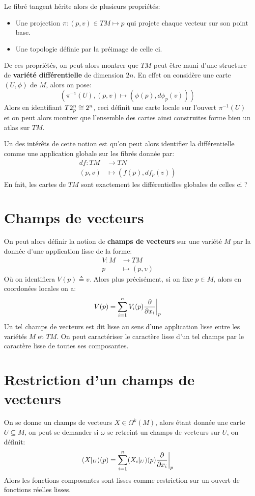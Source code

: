    Le fibré tangent hérite alors de plusieurs propriétés:
   \begin{itemize}
      \item Une projection \( \pi : (p, v) \in TM \mapsto p\) qui projete chaque vecteur sur son point base.
      \item Une topologie définie par la préimage de celle ci.
   \end{itemize}
   De ces propriétés, on peut alors montrer que \( TM \) peut être muni d'une structure de \textbf{variété différentielle} de dimension \( 2n \). En effet on considère une carte \( (U, \phi) \) de \( M \), alors on pose:
   \[ 
      \left(\pi^{-1}(U), (p, v) \mapsto (\phi(p), d\phi_p(v)) \right)
   \]
   Alors en identifiant \( T2^n_p \cong 2^n \), ceci définit une carte locale sur l'ouvert \(\pi^{-1}(U)\) et on peut alors montrer que l'ensemble des cartes ainsi construites forme bien un atlas sur \( TM \).\<

   Un des intérêts de cette notion est qu'on peut alors identifier la différentielle comme une application globale sur les fibrés donnée par:
   \[ 
      \begin{aligned}
         df : TM &\longrightarrow TN \\
         (p, v) &\longmapsto (f(p), df_p(v))
      \end{aligned} 
   \]
   En fait, les cartes de \( TM \) sont exactement les différentielles globales de celles ci ?
   \section{Champs de vecteurs}
   On peut alors définir la notion de \textbf{champs de vecteurs} sur une variété \( M \) par la donnée d'une application lisse de la forme:
   \[ 
      \begin{aligned}
         V : M &\longrightarrow TM \\
         p &\longmapsto (p, v)
      \end{aligned} 
   \]
   Où on identifiera \( V(p) \triangleq v \). Alors plus précisément, si on fixe \( p \in M \), alors en coordonées locales on a:
   \[ 
      V(p) = \sum_{i = 1}^n V_i(p) \frac{\partial }{\partial x_i}\biggr|_p
   \]
   Un tel champs de vecteurs est dit lisse au sens d'une application lisse entre les variétés \( M \) et \( TM \). On peut caractériser le caractère lisse d'un tel champs par le caractère lisse de toutes ses composantes.
   \section{Restriction d'un champs de vecteurs}
   On se donne un champs de vecteurs \( X \in \Omega^k(M) \), alors étant donnée une carte \( U \subseteq M \), on peut se demander si \( \omega \) se retreint un champs de vecteurs sur \( U \), on définit:
   \[ 
      (X|_U)(p) = \sum_{i =1}^{n}(X_i|_U)(p) \frac{\partial }{\partial x_i}\biggr|_p 
   \]
   Alors les fonctions composantes sont lisses comme restriction sur un ouvert de fonctions réelles lisses.
